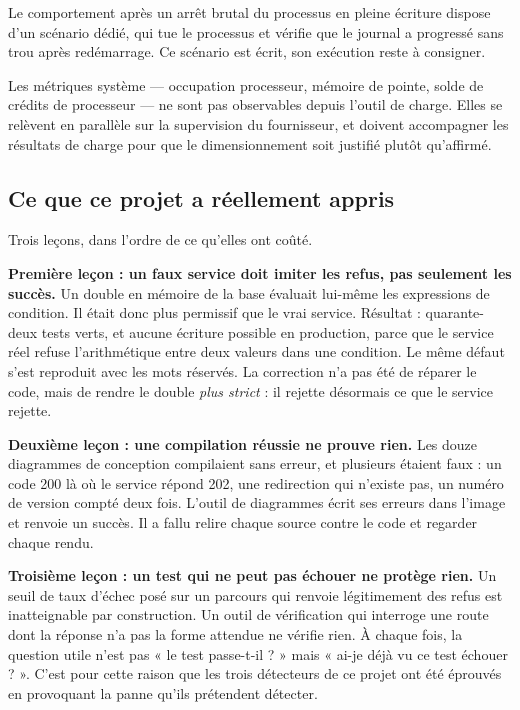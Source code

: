 Le comportement après un arrêt brutal du processus en pleine écriture dispose
d'un scénario dédié, qui tue le processus et vérifie que le journal a progressé
sans trou après redémarrage. Ce scénario est écrit, son exécution reste à
consigner.

Les métriques système — occupation processeur, mémoire de pointe, solde de
crédits de processeur — ne sont pas observables depuis l'outil de charge. Elles
se relèvent en parallèle sur la supervision du fournisseur, et doivent
accompagner les résultats de charge pour que le dimensionnement soit justifié
plutôt qu'affirmé.

\subsection{Ce que ce projet a réellement appris}

Trois leçons, dans l'ordre de ce qu'elles ont coûté.

\textbf{Première leçon : un faux service doit imiter les refus, pas seulement les
succès.} Un double en mémoire de la base évaluait lui-même les expressions de
condition. Il était donc plus permissif que le vrai service. Résultat :
quarante-deux tests verts, et aucune écriture possible en production, parce que le
service réel refuse l'arithmétique entre deux valeurs dans une condition. Le même
défaut s'est reproduit avec les mots réservés. La correction n'a pas été de
réparer le code, mais de rendre le double \emph{plus strict} : il rejette
désormais ce que le service rejette.

\textbf{Deuxième leçon : une compilation réussie ne prouve rien.} Les douze
diagrammes de conception compilaient sans erreur, et plusieurs étaient faux : un
code 200 là où le service répond 202, une redirection qui n'existe pas, un
numéro de version compté deux fois. L'outil de diagrammes écrit ses erreurs dans
l'image et renvoie un succès. Il a fallu relire chaque source contre le code et
regarder chaque rendu.

\textbf{Troisième leçon : un test qui ne peut pas échouer ne protège rien.} Un
seuil de taux d'échec posé sur un parcours qui renvoie légitimement des refus est
inatteignable par construction. Un outil de vérification qui interroge une route
dont la réponse n'a pas la forme attendue ne vérifie rien. À chaque fois, la
question utile n'est pas « le test passe-t-il ? » mais « ai-je déjà vu ce test
échouer ? ». C'est pour cette raison que les trois détecteurs de ce projet ont
été éprouvés en provoquant la panne qu'ils prétendent détecter.

